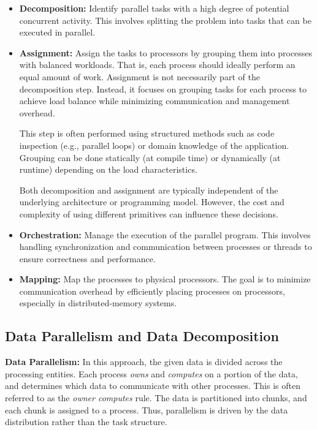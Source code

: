 \documentclass[12pt]{book}
\begin{document}
\begin{itemize}
    \item \textbf{Decomposition:} Identify parallel tasks with a high degree of potential concurrent activity. This involves splitting the problem into tasks that can be executed in parallel.

    \item \textbf{Assignment:} Assign the tasks to processors by grouping them into processes with balanced workloads. That is, each process should ideally perform an equal amount of work. Assignment is not necessarily part of the decomposition step. Instead, it focuses on grouping tasks for each process to achieve load balance while minimizing communication and management overhead. 

    This step is often performed using structured methods such as code inspection (e.g., parallel loops) or domain knowledge of the application. Grouping can be done statically (at compile time) or dynamically (at runtime) depending on the load characteristics.

    Both decomposition and assignment are typically independent of the underlying architecture or programming model. However, the cost and complexity of using different primitives can influence these decisions.

    \item \textbf{Orchestration:} Manage the execution of the parallel program. This involves handling synchronization and communication between processes or threads to ensure correctness and performance.

    \item \textbf{Mapping:} Map the processes to physical processors. The goal is to minimize communication overhead by efficiently placing processes on processors, especially in distributed-memory systems.
\end{itemize}


\subsection{Data Parallelism and Data Decomposition}

\textbf{Data Parallelism:} In this approach, the given data is divided across the processing entities. Each process \emph{owns} and \emph{computes} on a portion of the data, and determines which data to communicate with other processes. This is often referred to as the \textit{owner computes} rule. The data is partitioned into chunks, and each chunk is assigned to a process. Thus, parallelism is driven by the data distribution rather than the task structure. 
\end{document}
